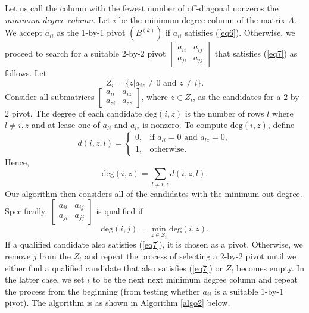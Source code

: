 \documentclass{article}
\begin{document}
Let us call the column with the fewest number of off-diagonal nonzeros the \textit{minimum degree column}.
Let $i$ be the minimum degree column of the matrix $A$.
We accept $a_{ii}$ as the 1-by-1 pivot $(B^{(k)})$ if $a_{ii}$ satisfies (\ref{eq6}).
Otherwise, we proceed to search for a suitable 2-by-2 pivot $\begin{bmatrix} a_{ii}  & a_{ij} \\  a_{ji} & a_{jj}\end{bmatrix}$ that satisfies (\ref{eq7}) as follows.
Let 
\begin{equation}
\label{eq10}
Z_i = \{ z | a_{iz}\neq 0 \mbox{ and } z\neq i\}.
\end{equation}
Consider all submatrices $\begin{bmatrix} a_{ii}&a_{iz}\\a_{zi}&a_{zz}\end{bmatrix}$, where $z \in Z_i$, as the candidates for a $2$-by-$2$ pivot.  The degree of each candidate $\text{deg}(i,z)$ is the number of rows $l$ where $l \neq i, z$ and at lease one of $a_{li}$ and $a_{lz}$ is nonzero.  To compute $\text{deg}(i,z)$, define
\begin{equation} \label{eq8}
d(i,z,l)=\left\{
\begin{array}{ll}
0 ,& \mbox{if } a_{li}=0 \mbox{ and } a_{lz} = 0,\\
1 ,& \mbox{otherwise.} 
\end{array}
\right.
\end{equation}
Hence,
\begin{equation} \label{eq9}
\text{deg}(i,z) = \sum_{l\neq i,z}d(i,z,l).
\end{equation}
Our algorithm then considers all of the candidates with the minimum out-degree.  Specifically, 
$\begin{bmatrix} a_{ii}  & a_{ij} \\  a_{ji} & a_{jj}\end{bmatrix}$ is qualified if
\begin{equation}\label{eq11}
\text{deg}(i,j) = \min_{z \in Z_i} \text{deg}(i,z).
\end{equation}
If a qualified candidate also satisfies (\ref{eq7}), it is chosen as a pivot.  Otherwise, we remove $j$ from the $Z_i$ and repeat the process of selecting a $2$-by-$2$ pivot until we either find a qualified candidate that also satisfies (\ref{eq7}) or $Z_i$ becomes empty.  In the latter case, we set $i$ to be the next next minimum degree column and repeat the process from the beginning (from testing whether $a_{ii}$ is a suitable $1$-by-$1$ pivot).  
The algorithm is as shown in Algorithm \ref{algo2} below.
\end{document}
